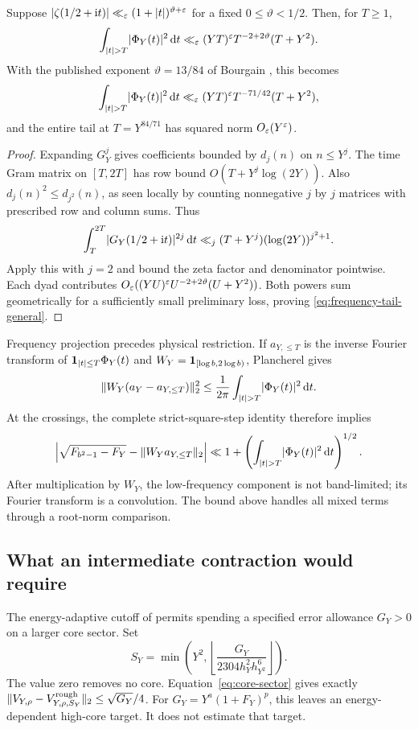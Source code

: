 \begin{proposition}\label{prop:frequency-tail}
Suppose $\lvert\zeta(1/2+\mathrm i t)\rvert\ll_\varepsilon(1+\lvert t\rvert)^{\vartheta+\varepsilon}$ for a fixed $0\le\vartheta<1/2$. Then, for $T\ge1$,
\begin{equation}\label{eq:frequency-tail-general}
 \int_{\lvert t\rvert>T}\lvert\Phi_Y(t)\rvert^2\,\mathrm d t
 \ll_\varepsilon (YT)^\varepsilon T^{-2+2\vartheta}(T+Y^2).
\end{equation}
With the published exponent $\vartheta=13/84$ of Bourgain \cite{Bourgain17}, this becomes
\[
 \int_{\lvert t\rvert>T}\lvert\Phi_Y(t)\rvert^2\,\mathrm d t
 \ll_\varepsilon(YT)^\varepsilon T^{-71/42}(T+Y^2),
\]
and the entire tail at $T=Y^{84/71}$ has squared norm $O_\varepsilon(Y^\varepsilon)$.
\end{proposition}
\begin{proof}
Expanding $G_Y^j$ gives coefficients bounded by $d_j(n)$ on $n\le Y^j$. The time Gram matrix on $[T,2T]$ has row bound $O(T+Y^j\log(2Y))$. Also $d_j(n)^2\le d_{j^2}(n)$, as seen locally by counting nonnegative $j$ by $j$ matrices with prescribed row and column sums. Thus
\[
 \int_T^{2T}\lvert G_Y(1/2+\mathrm i t)\rvert^{2j}\,\mathrm d t
 \ll_j(T+Y^j)(\log(2Y))^{j^2+1}.
\]
Apply this with $j=2$ and bound the zeta factor and denominator pointwise. Each dyad contributes
$O_\varepsilon((YU)^\varepsilon U^{-2+2\vartheta}(U+Y^2))$. Both powers sum geometrically for a sufficiently small preliminary loss, proving \eqref{eq:frequency-tail-general}.
\end{proof}

Frequency projection precedes physical restriction. If $a_{Y,\le T}$ is the inverse Fourier transform of $\mathbf 1_{\lvert t\rvert\le T}\Phi_Y(t)$ and $W_Y=\mathbf 1_{[\log b,2\log b)}$, Plancherel gives
\[
 \lVert W_Y(a_Y-a_{Y,\le T})\rVert_2^2
 \le\frac1{2\pi}\int_{\lvert t\rvert>T}\lvert\Phi_Y(t)\rvert^2\,\mathrm d t.
\]
At the crossings, the complete strict-square-step identity therefore implies
\[
 \left|\sqrt{F_{b^2-1}-F_Y}-\lVert W_Ya_{Y,\le T}\rVert_2\right|
 \ll1+\left(\int_{\lvert t\rvert>T}\lvert\Phi_Y(t)\rvert^2\,\mathrm d t\right)^{1/2}.
\]
After multiplication by $W_Y$, the low-frequency component is not band-limited; its Fourier transform is a convolution. The bound above handles all mixed terms through a root-norm comparison.

\subsection{What an intermediate contraction would require}
The energy-adaptive cutoff of \cite{R1002} permits spending a specified error allowance $G_Y>0$ on a larger core sector. Set
\[
 S_Y=\min\left(Y^2,\left\lfloor
       \frac{G_Y}{2304h_Y^2h_{Y^2}^6}\right\rfloor\right).
\]
The value zero removes no core. Equation~\eqref{eq:core-sector} gives exactly
$\lVert V_{Y,\rho}-V^{\mathrm{rough}}_{Y,\rho,S_Y}\rVert_2\le\sqrt{G_Y}/4$.
For $G_Y=Y^a(1+F_Y)^p$, this leaves an energy-dependent high-core target. It does not estimate that target.

